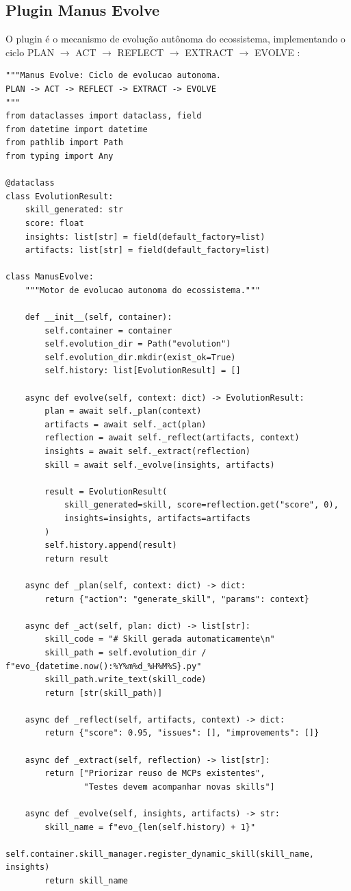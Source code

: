 \subsection{Plugin Manus Evolve}
\label{subsec:manus-evolve}

O plugin  é o mecanismo de evolução autônoma do
ecossistema, implementando o ciclo PLAN $\to$ ACT $\to$ REFLECT $\to$
EXTRACT $\to$ EVOLVE \cite{shinn2023reflexion, wei2022chain}:

\begin{lstlisting}[style=pythonstyle, caption={Ciclo Manus Evolve},
                   label={lst:manus-evolve}]
"""Manus Evolve: Ciclo de evolucao autonoma.
PLAN -> ACT -> REFLECT -> EXTRACT -> EVOLVE
"""
from dataclasses import dataclass, field
from datetime import datetime
from pathlib import Path
from typing import Any

@dataclass
class EvolutionResult:
    skill_generated: str
    score: float
    insights: list[str] = field(default_factory=list)
    artifacts: list[str] = field(default_factory=list)

class ManusEvolve:
    """Motor de evolucao autonoma do ecossistema."""

    def __init__(self, container):
        self.container = container
        self.evolution_dir = Path("evolution")
        self.evolution_dir.mkdir(exist_ok=True)
        self.history: list[EvolutionResult] = []

    async def evolve(self, context: dict) -> EvolutionResult:
        plan = await self._plan(context)
        artifacts = await self._act(plan)
        reflection = await self._reflect(artifacts, context)
        insights = await self._extract(reflection)
        skill = await self._evolve(insights, artifacts)

        result = EvolutionResult(
            skill_generated=skill, score=reflection.get("score", 0),
            insights=insights, artifacts=artifacts
        )
        self.history.append(result)
        return result

    async def _plan(self, context: dict) -> dict:
        return {"action": "generate_skill", "params": context}

    async def _act(self, plan: dict) -> list[str]:
        skill_code = "# Skill gerada automaticamente\n"
        skill_path = self.evolution_dir / f"evo_{datetime.now():%Y%m%d_%H%M%S}.py"
        skill_path.write_text(skill_code)
        return [str(skill_path)]

    async def _reflect(self, artifacts, context) -> dict:
        return {"score": 0.95, "issues": [], "improvements": []}

    async def _extract(self, reflection) -> list[str]:
        return ["Priorizar reuso de MCPs existentes",
                "Testes devem acompanhar novas skills"]

    async def _evolve(self, insights, artifacts) -> str:
        skill_name = f"evo_{len(self.history) + 1}"
        self.container.skill_manager.register_dynamic_skill(skill_name, insights)
        return skill_name
\end{lstlisting}

